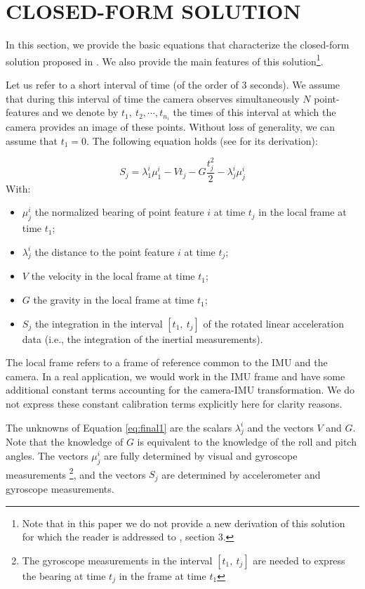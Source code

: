 \documentclass[letterpaper, 10 pt, conference]{ieeeconf}  %
\begin{document}
\section{CLOSED-FORM SOLUTION}\label{SectionCFS}

In this section, we provide the basic equations that characterize the closed-form solution proposed in  \cite{Martinelli2014}. We also provide the main features of this solution\footnote{Note that in this paper we do not provide a new derivation of this solution for which the reader is addressed to \cite{Martinelli2014}, section 3.}.

Let us refer to a short interval of time (of the order of $3$ seconds). We assume that during this interval of time the camera observes simultaneously $N$ point-features and we denote by $t_1,~t_2,\cdots,t_{n_i}$ the times of this interval at which the camera provides an image of these points. Without loss of generality, we can assume that $t_1=0$.
The following equation holds (see \cite{Martinelli2014} for its derivation):


\begin{equation} \tag{6} \label{eq:final1}
S_j = \lambda_1^i\mu_1^i - V t_j - G \frac{t_j^2}{2} - \lambda^i_j \mu^i_j
\end{equation}
With:
\begin{itemize}
\item $\mu_j^i$ the normalized bearing of point feature $i$ at time $t_j$ in the local frame at time $t_1$;
\item $\lambda_j^i$ the distance to the point feature $i$ at time $t_j$;
\item $V$ the velocity in the local frame at time $t_1$;
\item $G$ the gravity in the local frame  at time $t_1$;
\item $S_j$ the integration in the interval $[t_1, ~t_j]$ of the rotated linear acceleration data (i.e., the integration of the inertial measurements).
\end{itemize}


The local frame refers to a frame of reference common to the IMU and the camera.
In a real application, we would work in the IMU frame and have some additional constant terms
accounting for the camera-IMU transformation.
We do not express these constant calibration terms explicitly here for clarity reasons.

The unknowns of Equation \ref{eq:final1} are the scalars $\lambda_j^i$ and the vectors $V$ and $G$.
Note that the knowledge of $G$ is equivalent to the knowledge of the roll and pitch angles.
The vectors $\mu_j^i$ are fully determined by visual and gyroscope measurements \footnote{The gyroscope measurements in the interval $[t_1, ~t_j]$ are needed to express the bearing at time $t_j$ in the frame at time $t_1$},
and the vectors $S_j$ are determined by accelerometer and gyroscope measurements.
\end{document}
